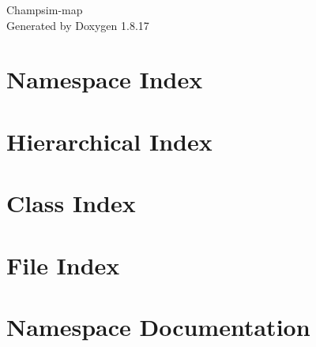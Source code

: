 \let\mypdfximage\pdfximage\def\pdfximage{\immediate\mypdfximage}\documentclass[twoside]{book}
\newcommand{\+}{\discretionary{\mbox{\scriptsize$\hookleftarrow$}}{}{}}
\newcommand{\clearemptydoublepage}{%
  \newpage{\pagestyle{empty}\cleardoublepage}%
}
\begin{document}
\hypersetup{pageanchor=false,
             bookmarksnumbered=true,
             pdfencoding=unicode
            }
\begin{titlepage}
\vspace*{7cm}
\begin{center}%
{\Large Champsim-\/map }\\
\vspace*{1cm}
{\large Generated by Doxygen 1.8.17}\\
\end{center}
\end{titlepage}
\clearemptydoublepage
{}
\tableofcontents
\clearemptydoublepage
{}
\hypersetup{pageanchor=true}

\chapter{Namespace Index}

\chapter{Hierarchical Index}

\chapter{Class Index}

\chapter{File Index}

\chapter{Namespace Documentation}


\end{document}
